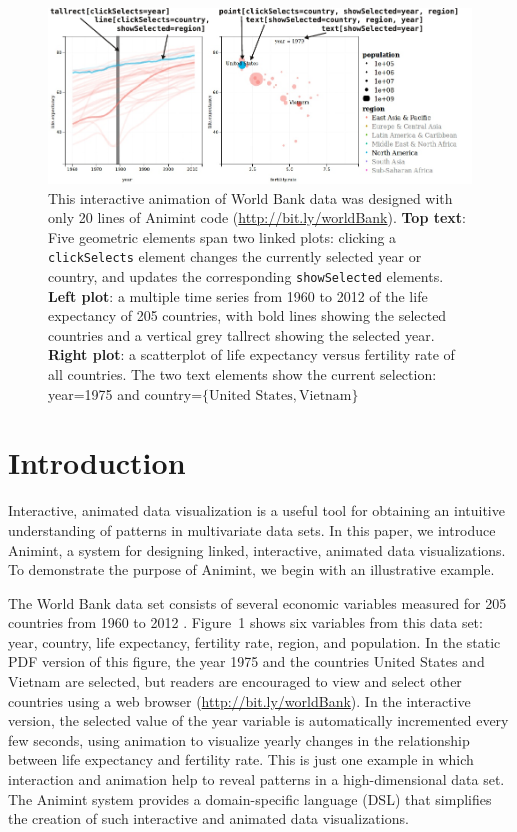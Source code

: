 \documentclass[10pt,journal,compsoc]{IEEEtran}\usepackage[]{graphicx}\usepackage[]{color}
\begin{document}
\begin{figure}[b!]
  \centering
  \includegraphics[width=\textwidth]{figure-1}
  \caption{This interactive animation of World Bank data was designed
    with only 20 lines of Animint code (\url{http://bit.ly/worldBank}).
    \textbf{Top text}: Five geometric elements span two linked plots:
    clicking a \texttt{clickSelects} element changes the currently
    selected year or country, and updates the corresponding
    \texttt{showSelected} elements.  \textbf{Left plot}: a multiple
    time series from 1960 to 2012 of the life expectancy of 205
    countries, with bold lines showing the selected countries and a
    vertical grey tallrect showing the selected year.  \textbf{Right
      plot}: a scatterplot of life expectancy versus fertility rate of
    all countries. The two text elements show the current selection:
    year=1975 and country=$\{\textrm{United States},
    \textrm{Vietnam}\}$}
  \label{fig:1}
\end{figure}

\section{Introduction}

Interactive, animated data visualization is a useful tool for
obtaining an intuitive understanding of patterns in multivariate data
sets. In this paper, we introduce Animint, a system for designing
linked, interactive, animated data visualizations. To demonstrate the
purpose of Animint, we begin with an illustrative example.

The World Bank data set consists of several economic
variables measured for 205 countries from 1960 to 2012
\citep{WorldBank}. Figure~1 shows six variables from this data set:
year, country, life expectancy, fertility rate, region, and
population. In the static PDF version of this figure, the year 1975
and the countries United States and Vietnam are selected, but readers
are encouraged to view and select other countries using a web browser
(\url{http://bit.ly/worldBank}).
In the interactive version, the selected value of the year variable is
automatically incremented every few seconds, using animation to
visualize yearly changes in the relationship between life expectancy and
fertility rate. This is just one example in
which interaction and animation help to reveal patterns in a
high-dimensional data set. The Animint system provides a
domain-specific language (DSL) that simplifies the creation of such
interactive and animated data visualizations.
\end{document}

